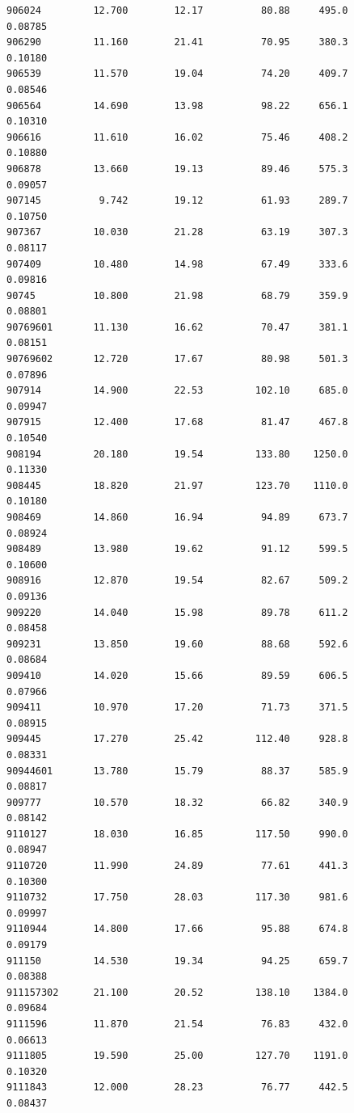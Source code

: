 \documentclass[
  letterpaper,
  DIV=11,
  numbers=noendperiod]{scrartcl}
\begin{document}
\begin{verbatim}
906024         12.700        12.17          80.88     495.0         0.08785
906290         11.160        21.41          70.95     380.3         0.10180
906539         11.570        19.04          74.20     409.7         0.08546
906564         14.690        13.98          98.22     656.1         0.10310
906616         11.610        16.02          75.46     408.2         0.10880
906878         13.660        19.13          89.46     575.3         0.09057
907145          9.742        19.12          61.93     289.7         0.10750
907367         10.030        21.28          63.19     307.3         0.08117
907409         10.480        14.98          67.49     333.6         0.09816
90745          10.800        21.98          68.79     359.9         0.08801
90769601       11.130        16.62          70.47     381.1         0.08151
90769602       12.720        17.67          80.98     501.3         0.07896
907914         14.900        22.53         102.10     685.0         0.09947
907915         12.400        17.68          81.47     467.8         0.10540
908194         20.180        19.54         133.80    1250.0         0.11330
908445         18.820        21.97         123.70    1110.0         0.10180
908469         14.860        16.94          94.89     673.7         0.08924
908489         13.980        19.62          91.12     599.5         0.10600
908916         12.870        19.54          82.67     509.2         0.09136
909220         14.040        15.98          89.78     611.2         0.08458
909231         13.850        19.60          88.68     592.6         0.08684
909410         14.020        15.66          89.59     606.5         0.07966
909411         10.970        17.20          71.73     371.5         0.08915
909445         17.270        25.42         112.40     928.8         0.08331
90944601       13.780        15.79          88.37     585.9         0.08817
909777         10.570        18.32          66.82     340.9         0.08142
9110127        18.030        16.85         117.50     990.0         0.08947
9110720        11.990        24.89          77.61     441.3         0.10300
9110732        17.750        28.03         117.30     981.6         0.09997
9110944        14.800        17.66          95.88     674.8         0.09179
911150         14.530        19.34          94.25     659.7         0.08388
911157302      21.100        20.52         138.10    1384.0         0.09684
9111596        11.870        21.54          76.83     432.0         0.06613
9111805        19.590        25.00         127.70    1191.0         0.10320
9111843        12.000        28.23          76.77     442.5         0.08437

\end{verbatim}
\end{document}
